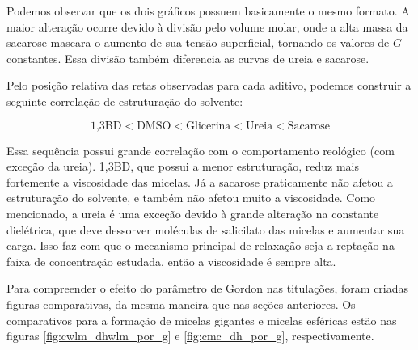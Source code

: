 		Podemos observar que os dois gráficos possuem basicamente o mesmo formato. A maior alteração ocorre devido à divisão pelo volume molar, onde a alta massa da sacarose mascara o aumento de sua tensão superficial, tornando os valores de \(G\) constantes. Essa divisão também diferencia as curvas de ureia e sacarose.
		
		Pelo posição relativa das retas observadas para cada aditivo, podemos construir a seguinte correlação de estruturação do solvente:
		
		\begin{equation*}
			\textrm{1,3BD} < \textrm{DMSO} < \textrm{Glicerina} < \textrm{Ureia} < \textrm{Sacarose}
		\end{equation*}
		
		Essa sequência possui grande correlação com o comportamento reológico (com exceção da ureia). 1,3BD, que possui a menor estruturação, reduz mais fortemente a viscosidade das micelas. Já a sacarose praticamente não afetou a estruturação do solvente, e também não afetou muito a viscosidade. Como mencionado, a ureia é uma exceção devido à grande alteração na constante dielétrica, que deve dessorver moléculas de salicilato das micelas e aumentar sua carga. Isso faz com que o mecanismo principal de relaxação seja a reptação na faixa de concentração estudada, então a viscosidade é sempre alta.
		
		Para compreender o efeito do parâmetro de Gordon nas titulações, foram criadas figuras comparativas, da mesma maneira que nas seções anteriores. Os comparativos para a formação de micelas gigantes e micelas esféricas estão nas figuras \ref{fig:cwlm_dhwlm_por_g} e \ref{fig:cmc_dh_por_g}, respectivamente.
		
